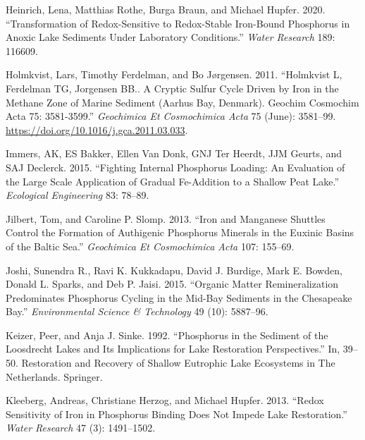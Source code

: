 \documentclass[a4paper,11pt]{article}
\newenvironment{CSLReferences}%
  {}%
  {\par}
\begin{document}
\begin{CSLReferences}{1}{0}
\leavevmode\hypertarget{ref-heinrichTransformationRedoxsensitiveRedoxstable2020}{}%
Heinrich, Lena, Matthias Rothe, Burga Braun, and Michael Hupfer. 2020. {``Transformation of Redox-Sensitive to Redox-Stable Iron-Bound Phosphorus in Anoxic Lake Sediments Under Laboratory Conditions.''} \emph{Water Research} 189: 116609.

\leavevmode\hypertarget{ref-holmkvistHolmkvistFerdelmanTG2011}{}%
Holmkvist, Lars, Timothy Ferdelman, and Bo Jørgensen. 2011. {``Holmkvist {L}, {Ferdelman TG}, {Jorgensen BB}.. {A} Cryptic Sulfur Cycle Driven by Iron in the Methane Zone of Marine Sediment ({Aarhus Bay}, {Denmark}). {Geochim Cosmochim Acta} 75: 3581-3599.''} \emph{Geochimica Et Cosmochimica Acta} 75 (June): 3581--99. \url{https://doi.org/10.1016/j.gca.2011.03.033}.

\leavevmode\hypertarget{ref-immersFightingInternalPhosphorus2015}{}%
Immers, AK, ES Bakker, Ellen Van Donk, GNJ Ter Heerdt, JJM Geurts, and SAJ Declerck. 2015. {``Fighting Internal Phosphorus Loading: An Evaluation of the Large Scale Application of Gradual {Fe}-Addition to a Shallow Peat Lake.''} \emph{Ecological Engineering} 83: 78--89.

\leavevmode\hypertarget{ref-jilbertIronManganeseShuttles2013}{}%
Jilbert, Tom, and Caroline P. Slomp. 2013. {``Iron and Manganese Shuttles Control the Formation of Authigenic Phosphorus Minerals in the Euxinic Basins of the {Baltic Sea}.''} \emph{Geochimica Et Cosmochimica Acta} 107: 155--69.

\leavevmode\hypertarget{ref-joshiOrganicMatterRemineralization2015}{}%
Joshi, Sunendra R., Ravi K. Kukkadapu, David J. Burdige, Mark E. Bowden, Donald L. Sparks, and Deb P. Jaisi. 2015. {``Organic Matter Remineralization Predominates Phosphorus Cycling in the Mid-Bay Sediments in the {Chesapeake Bay}.''} \emph{Environmental Science \& Technology} 49 (10): 5887--96.

\leavevmode\hypertarget{ref-keizerPhosphorusSedimentLoosdrecht1992}{}%
Keizer, Peer, and Anja J. Sinke. 1992. {``Phosphorus in the Sediment of the {Loosdrecht} Lakes and Its Implications for Lake Restoration Perspectives.''} In, 39--50. Restoration and {Recovery} of {Shallow Eutrophic Lake Ecosystems} in {The Netherlands}. {Springer}.

\leavevmode\hypertarget{ref-kleebergRedoxSensitivityIron2013}{}%
Kleeberg, Andreas, Christiane Herzog, and Michael Hupfer. 2013. {``Redox Sensitivity of Iron in Phosphorus Binding Does Not Impede Lake Restoration.''} \emph{Water Research} 47 (3): 1491--1502.


\end{CSLReferences}
\end{document}
